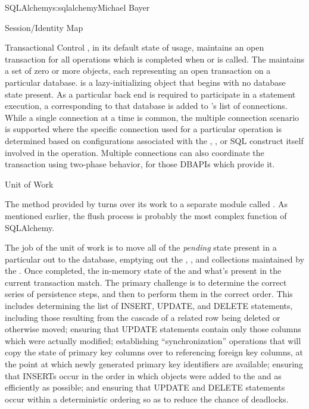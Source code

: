 \begin{aosachapter}{SQLAlchemy}{s:sqlalchemy}{Michael Bayer}
\begin{aosasect1}{Session/Identity Map}
\begin{aosasect2}{Transactional Control}
, in its default state of usage, maintains an
open transaction for all operations which is completed
when  or  is called. The
 maintains a set of zero or more
 objects, each representing an open
transaction on a particular database.
 is a lazy-initializing object that
begins with no database state present. As a particular
back end is required to participate in a statement
execution, a  corresponding to that
database is added to 's list of
connections. While a single connection at a time is
common, the multiple connection scenario is supported
where the specific connection used for a particular
operation is determined based on configurations
associated with the , , or SQL
construct itself involved in the operation. Multiple
connections can also coordinate the transaction using
two-phase behavior, for those DBAPIs which provide it.

\end{aosasect2}

\end{aosasect1}

\begin{aosasect1}{Unit of Work}

The  method provided by  turns over its work
to a separate module called .   As mentioned earlier, the flush process
is probably the most complex function of SQLAlchemy.

The job of the unit of work is to move all of the \emph{pending} state present in a particular
 out to the database, emptying out the , , and 
collections maintained by the .  Once completed, the in-memory state of the
 and what's present in the current transaction match.
The primary challenge is to determine the correct
series of persistence steps, and then to perform them in the correct order.  This includes
determining the list of INSERT, UPDATE, and DELETE statements, including those resulting
from the cascade of a related row being deleted or otherwise moved; ensuring that UPDATE
statements contain only those columns which were actually modified; establishing ``synchronization''
operations that will copy the state of primary key columns over to referencing foreign key
columns, at the point at which newly generated primary key identifiers are available; ensuring
that INSERTs occur in the order in which objects were added to the  and
as efficiently as possible; and ensuring that
UPDATE and DELETE statements occur within a deterministic ordering so as to reduce the chance
of deadlocks.


\end{aosasect1}
\end{aosachapter}
